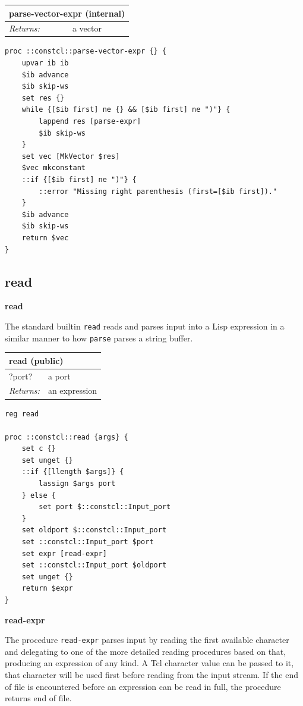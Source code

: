 \documentclass[twoside,9pt]{report}
\begin{document}
\begin{tabular}{ |l l| }
\hline
\multicolumn{2}{|l|}{parse-vector-expr (internal)} \\
\hline
\textit{Returns:} & a vector \\
\hline
\end{tabular}

\noindent\makebox[\linewidth]{\rule{\linewidth}{0.4pt}}
\begin{lstlisting}
proc ::constcl::parse-vector-expr {} {
    upvar ib ib
    $ib advance
    $ib skip-ws
    set res {}
    while {[$ib first] ne {} && [$ib first] ne ")"} {
        lappend res [parse-expr]
        $ib skip-ws
    }
    set vec [MkVector $res]
    $vec mkconstant
    ::if {[$ib first] ne ")"} {
        ::error "Missing right parenthesis (first=[$ib first])."
    }
    $ib advance
    $ib skip-ws
    return $vec
}
\end{lstlisting}
\noindent\makebox[\linewidth]{\rule{\linewidth}{0.4pt}}
\subsection{read}
\label{read}

\textbf{read}


The standard builtin \texttt{read} reads and parses input into a Lisp expression in a similar manner to how \texttt{parse} parses a string buffer.

\begin{tabular}{ |l l| }
\hline
\multicolumn{2}{|l|}{read (public)} \\
\hline
?port? & a port \\
\textit{Returns:} & an expression \\
\hline
\end{tabular}

\noindent\makebox[\linewidth]{\rule{\linewidth}{0.4pt}}
\begin{lstlisting}
reg read
 
proc ::constcl::read {args} {
    set c {}
    set unget {}
    ::if {[llength $args]} {
        lassign $args port
    } else {
        set port $::constcl::Input_port
    }
    set oldport $::constcl::Input_port
    set ::constcl::Input_port $port
    set expr [read-expr]
    set ::constcl::Input_port $oldport
    set unget {}
    return $expr
}
\end{lstlisting}
\noindent\makebox[\linewidth]{\rule{\linewidth}{0.4pt}}

\textbf{read-expr}


The procedure \texttt{read-expr} parses input by reading the first available character and delegating to one of the more detailed reading procedures based on that, producing an expression of any kind. A Tcl character value can be passed to it, that character will be used first before reading from the input stream. If the end of file is encountered before an expression can be read in full, the procedure returns end of file.
\end{document}
